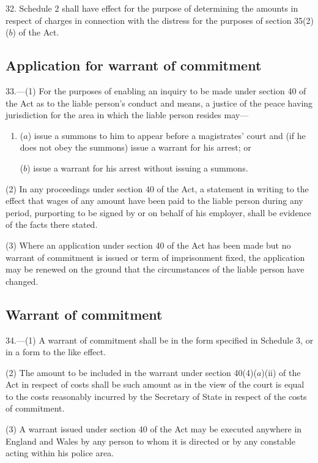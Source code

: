 \documentclass[12pt,a4paper]{article}
\begin{document}
32.  Schedule 2 shall have effect for the purpose of determining the amounts in respect of charges in connection with the distress for the purposes of section 35(2)($b$) of the Act.

\subsection[33. Application for warrant of commitment]{Application for warrant of commitment}

33.—(1) For the purposes of enabling an inquiry to be made under section 40 of the Act as to the liable person’s conduct and means, a justice of the peace having jurisdiction for the area in which the liable person resides may—
\begin{enumerate}\item[]
($a$) issue a summons to him to appear before a magistrates' court and (if he does not obey the summons) issue a warrant for his arrest; or

($b$) issue a warrant for his arrest without issuing a summons.
\end{enumerate}

(2) In any proceedings under section 40 of the Act, a statement in writing to the effect that wages of any amount have been paid to the liable person during any period, purporting to be signed by or on behalf of his employer, shall be evidence of the facts there stated.

(3) Where an application under section 40 of the Act has been made but no warrant of commitment is issued or term of imprisonment fixed, the application may be renewed on the ground that the circumstances of the liable person have changed.

\subsection[34. Warrant of commitment]{Warrant of commitment}

34.—(1) A warrant of commitment shall be in the form specified in Schedule 3, or in a form to the like effect.

(2) The amount to be included in the warrant under section 40(4)($a$)(ii) of the Act in respect of costs shall be such amount as in the view of the court is equal to the costs reasonably incurred by the Secretary of State in respect of the costs of commitment.

(3) A warrant issued under section 40 of the Act may be executed anywhere in England and Wales by any person to whom it is directed or by any constable acting within his police area.
\end{document}
